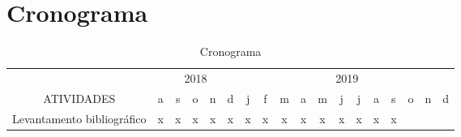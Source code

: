 \chapter{Cronograma}
\label{apend:1}

\begin{table}[h]
 \centering
 \caption{Cronograma}
 {\renewcommand\arraystretch{1.25}
 \begin{tabular}{ l l l l l l l l l l l l l l l l l l }
  \cline{1-1}\cline{2-2}\cline{3-3}\cline{4-4}\cline{5-5}\cline{6-6}\cline{7-7}\cline{8-8}\cline{9-9}\cline{10-10}\cline{11-11}\cline{12-12}\cline{13-13}\cline{14-14}\cline{15-15}\cline{16-16}\cline{17-17}\cline{18-18}  
    \multicolumn{1}{|c|}{  \centering } &
    \multicolumn{5}{c|}{2018 \centering } &
    \multicolumn{12}{c|}{2019 \centering }
  \\  
  \cline{1-1}\cline{2-2}\cline{3-3}\cline{4-4}\cline{5-5}\cline{6-6}\cline{7-7}\cline{8-8}\cline{9-9}\cline{10-10}\cline{11-11}\cline{12-12}\cline{13-13}\cline{14-14}\cline{15-15}\cline{16-16}\cline{17-17}\cline{18-18}  
    \multicolumn{1}{|c|}{ATIVIDADES} &
    \multicolumn{1}{c|}{a \centering } &
    \multicolumn{1}{c|}{s \centering } &
    \multicolumn{1}{c|}{o \centering } &
    \multicolumn{1}{c|}{n \centering } &
    \multicolumn{1}{c|}{d \centering } &
    \multicolumn{1}{c|}{j \centering } &
    \multicolumn{1}{c|}{f \centering } &
    \multicolumn{1}{c|}{m \centering } &
    \multicolumn{1}{c|}{a \centering } &
    \multicolumn{1}{c|}{m \centering } &
    \multicolumn{1}{c|}{j \centering } &
    \multicolumn{1}{c|}{j \centering } &
    \multicolumn{1}{c|}{a \centering } &
    \multicolumn{1}{c|}{s \centering } &
    \multicolumn{1}{c|}{o \centering } &
    \multicolumn{1}{c|}{n \centering } &
    \multicolumn{1}{c|}{d \centering }
  \\  
  \cline{1-1}\cline{2-2}\cline{3-3}\cline{4-4}\cline{5-5}\cline{6-6}\cline{7-7}\cline{8-8}\cline{9-9}\cline{10-10}\cline{11-11}\cline{12-12}\cline{13-13}\cline{14-14}\cline{15-15}\cline{16-16}\cline{17-17}\cline{18-18}  
    \multicolumn{1}{|c|}{Levantamento bibliográfico} &
    \multicolumn{1}{c|}{x} &
    \multicolumn{1}{c|}{x} &
    \multicolumn{1}{c|}{x} &
    \multicolumn{1}{c|}{x} &
    \multicolumn{1}{c|}{x} &
    \multicolumn{1}{c|}{x} &
    \multicolumn{1}{c|}{x} &
    \multicolumn{1}{c|}{x} &
    \multicolumn{1}{c|}{x} &
    \multicolumn{1}{c|}{x} &
    \multicolumn{1}{c|}{x} &
    \multicolumn{1}{c|}{x} &
    \multicolumn{1}{c|}{x} &
    \multicolumn{1}{c|}{x} &

\end{tabular}}
\end{table}
